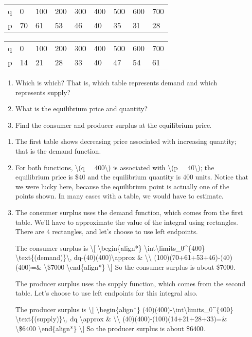 \begin{longtable}[]{@{}lllllllll@{}}
\toprule
\endhead
q & 0 & 100 & 200 & 300 & 400 & 500 & 600 & 700\tabularnewline
p & 70 & 61 & 53 & 46 & 40 & 35 & 31 & 28\tabularnewline
\bottomrule
\end{longtable}

\begin{longtable}[]{@{}lllllllll@{}}
\toprule
\endhead
q & 0 & 100 & 200 & 300 & 400 & 500 & 600 & 700\tabularnewline
p & 14 & 21 & 28 & 33 & 40 & 47 & 54 & 61\tabularnewline
\bottomrule
\end{longtable}

\begin{enumerate}
\tightlist
\item
  Which is which? That is, which table represents demand and which
  represents supply?
\item
  What is the equilibrium price and quantity?
\item
  Find the consumer and producer surplus at the equilibrium price.
\end{enumerate}

\begin{enumerate}
\item
  The first table shows decreasing price associated with increasing
  quantity; that is the demand function.
\item
  For both functions, \textbackslash{}(q = 400\textbackslash{}) is
  associated with \textbackslash{}(p = 40\textbackslash{}); the
  equilibrium price is \$40 and the equilibrium quantity is 400 units.
  Notice that we were lucky here, because the equilibrium point is
  actually one of the points shown. In many cases with a table, we would
  have to estimate.
\item
  The consumer surplus uses the demand function, which comes from the
  first table. We'll have to approximate the value of the integral using
  rectangles. There are 4 rectangles, and let's choose to use left
  endpoints.

  The consumer surplus is \textbackslash{}{[}
  \textbackslash{}begin\{align*\}
  \textbackslash{}int\textbackslash{}limits\_0\^{}\{400\}
  \textbackslash{}text\{(demand)\}\textbackslash{},
  dq-(40)(400)\textbackslash{}approx \& \textbackslash{}\textbackslash{}
  (100)(70+61+53+46)-(40)(400)=\& \textbackslash{}\$7000
  \textbackslash{}end\{align*\} \textbackslash{}{]} So the consumer
  surplus is about \$7000.

  The producer surplus uses the supply function, which comes from the
  second table. Let's choose to use left endpoints for this integral
  also.

  The producer surplus is \textbackslash{}{[}
  \textbackslash{}begin\{align*\}
  (40)(400)-\textbackslash{}int\textbackslash{}limits\_0\^{}\{400\}
  \textbackslash{}text\{(supply)\}\textbackslash{}, dq
  \textbackslash{}approx \& \textbackslash{}\textbackslash{}
  (40)(400)-(100)(14+21+28+33)=\& \textbackslash{}\$6400
  \textbackslash{}end\{align*\} \textbackslash{}{]} So the producer
  surplus is about \$6400.
\end{enumerate}

